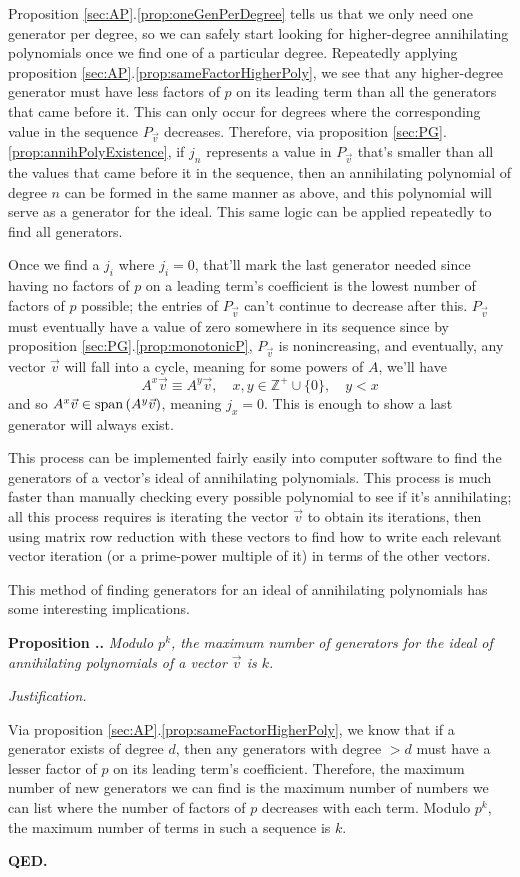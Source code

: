 \documentclass[a4paper, reqno, 12pt]{amsart}
\newcommand\vecspan[1]{\textup{span}\left(#1\right)}
\newcounter{propcounter}[section]
\newenvironment{proposition}[1]
{
	\refstepcounter{propcounter}
	\textbf{Proposition \thesection.\thepropcounter.} \emph{#1}
	
	\emph{Justification.}
}
{
	\textbf{QED.} \\
}
\begin{document}
		Proposition \ref{sec:AP}.\ref{prop:oneGenPerDegree} tells us that we only need one generator per degree, so we can safely start looking for higher-degree 
		annihilating polynomials once we find one of a particular degree. Repeatedly applying proposition \ref{sec:AP}.\ref{prop:sameFactorHigherPoly}, we see that any 
		higher-degree generator must have less factors of $p$ on its leading term than all the generators that came before it. This can only occur for degrees where the 
		corresponding value in the sequence $P_{\vec{v}}$ decreases. Therefore, via proposition \ref{sec:PG}.\ref{prop:annihPolyExistence}, if $j_n$ represents a value in 
		$P_{\vec{v}}$ that's smaller than all the values that came before it in the sequence, then an annihilating polynomial of degree $n$ can be formed in the same manner 
		as above, and this polynomial will serve as a generator for the ideal. This same logic can be applied repeatedly to find all generators.
		
		Once we find a $j_i$ where $j_i = 0$, that'll mark the last generator needed since having no factors of $p$ on a leading term's coefficient is the lowest number of 
		factors of $p$ possible; the entries of $P_{\vec{v}}$ can't continue to decrease after this. $P_{\vec{v}}$ must eventually have a value of zero somewhere in its 
		sequence since by proposition \ref{sec:PG}.\ref{prop:monotonicP}, $P_{\vec{v}}$ is nonincreasing, and eventually, any vector $\vec{v}$ will fall into a cycle, 
		meaning for some powers of $A$, we'll have
		\[
			A^x\vec{v} \equiv A^y\vec{v}, \quad x,y \in \mathds{Z}^+ \cup \{0\}, \quad y < x
		\]
		and so $A^x\vec{v} \in \vecspan{A^y\vec{v}}$, meaning $j_x = 0$. This is enough to show a last generator will always exist.
		
		This process can be implemented fairly easily into computer software to find the generators of a vector's ideal of annihilating polynomials. This process is much
		faster than manually checking every possible polynomial to see if it's annihilating; all this process requires is iterating the vector $\vec{v}$ to obtain its
		iterations, then using matrix row reduction with these vectors to find how to write each relevant vector iteration (or a prime-power multiple of it) in terms of the
		other vectors.
		
		This method of finding generators for an ideal of annihilating polynomials has some interesting implications.
		
		\begin{proposition}{Modulo $p^k$, the maximum number of generators for the ideal of annihilating polynomials of a vector $\vec{v}$ is $k$.}	
			\label{prop:maxGens}
			Via proposition \ref{sec:AP}.\ref{prop:sameFactorHigherPoly}, we know that if a generator exists of degree $d$, then any generators with degree $> d$ must have 
			a lesser factor of $p$ on its leading term's coefficient. Therefore, the maximum number of new generators we can find is the maximum number of numbers we can 
			list where the number of factors of $p$ decreases with each term. Modulo $p^k$, the maximum number of terms in such a sequence is $k$.
		\end{proposition}
		
\end{document}
